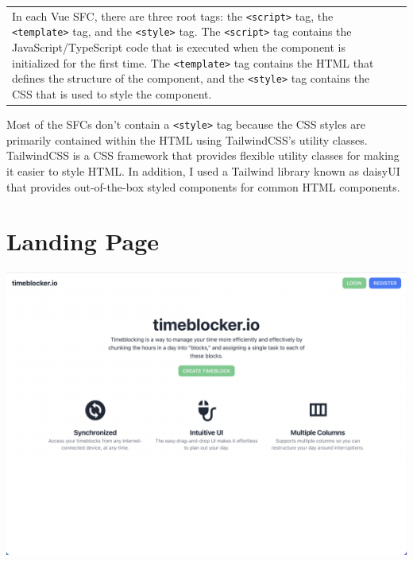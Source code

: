 \documentclass[notitlepage, 12pt]{report}
\newcommand{\code}[1]{\texttt{#1}}
\begin{document}
\noindent\begin{xltabular}{\textwidth}{
		@{}
		X
		p{0.6\textwidth}
		@{}
	}
	In each Vue SFC, there are three root tags: the \code{<script>} tag, the \code{<template>} tag, and the \code{<style>} tag. The \code{<script>} tag contains the JavaScript/TypeScript code that is executed when the component is initialized for the first time. The \code{<template>} tag contains the HTML that defines the structure of the component, and the \code{<style>} tag contains the CSS that is used to style the component.
	 &
	\centerline{}
\end{xltabular}

Most of the SFCs don't contain a \code{<style>} tag because the CSS styles are primarily contained within the HTML using TailwindCSS's utility classes. TailwindCSS is a CSS framework that provides flexible utility classes for making it easier to style HTML. In addition, I used a Tailwind library known as daisyUI that provides out-of-the-box styled components for common HTML components.

\section*{Landing Page}
\includegraphics[width=\textwidth]{frontend-landing-page.png}
\end{document}
